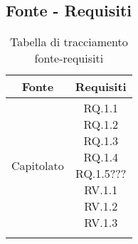 \subsection{Fonte - Requisiti}
\begin{table}[H]
  \centering
  \begin{tabular}{|c|c|}
    \hline
    \rowcolor[HTML]{036400}
    {\color[HTML]{FFFFFF} Fonte} & {\color[HTML]{FFFFFF} Requisiti} \\ \hline
    \rowcolor[HTML]{EFEFEF}
    Capitolato & \req{RQ.1.1 \\ RQ.1.2 \\ RQ.1.3 \\ RQ.1.4 \\ RQ.1.5??? \\ RV.1.1 \\ RV.1.2 \\ RV.1.3} \\ \hline
    \rowcolor[HTML]{C0C0C0}
    &  \\ \hline
  \end{tabular}
  \caption{Tabella di tracciamento fonte-requisiti}
\end{table}

